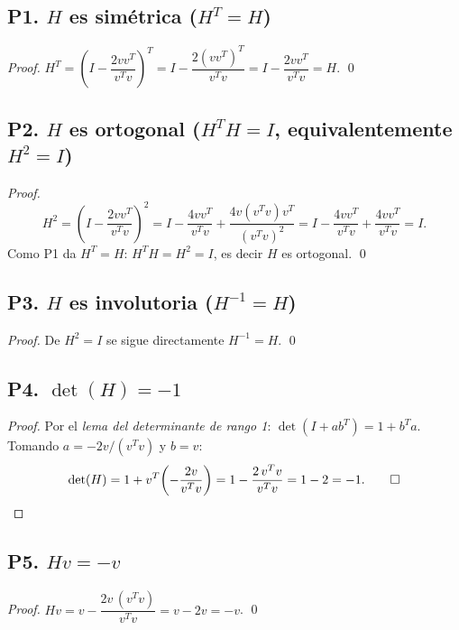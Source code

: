 \documentclass[11pt,a4paper]{article}
\begin{document}
\subsection{P1. $H$ es simétrica ($H^T = H$)}

\begin{proof}
$H^T = \left(I - \dfrac{2vv^T}{v^Tv}\right)^T = I - \dfrac{2(vv^T)^T}{v^Tv}
= I - \dfrac{2vv^T}{v^Tv} = H$. \qed
\end{proof}

\subsection{P2. $H$ es ortogonal ($H^TH = I$, equivalentemente $H^2 = I$)}

\begin{proof}
\[
  H^2 = \left(I - \frac{2vv^T}{v^Tv}\right)^2
  = I - \frac{4vv^T}{v^Tv} + \frac{4v(v^Tv)v^T}{(v^Tv)^2}
  = I - \frac{4vv^T}{v^Tv} + \frac{4vv^T}{v^Tv} = I.
\]
Como P1 da $H^T = H$: $H^TH = H^2 = I$, es decir $H$ es ortogonal. \qed
\end{proof}

\subsection{P3. $H$ es involutoria ($H^{-1} = H$)}

\begin{proof}
De $H^2 = I$ se sigue directamente $H^{-1} = H$. \qed
\end{proof}

\subsection{P4. $\det(H) = -1$}

\begin{proof}
Por el \textit{lema del determinante de rango 1}: $\det(I + ab^T) = 1 + b^Ta$.
Tomando $a = -2v/(v^Tv)$ y $b = v$:
\[
  \det(H) = 1 + v^T\!\left(-\frac{2v}{v^Tv}\right) = 1 - \frac{2\,v^Tv}{v^Tv} = 1-2 = -1. \qed
\]
\end{proof}

\subsection{P5. $Hv = -v$}

\begin{proof}
$Hv = v - \dfrac{2v\,(v^Tv)}{v^Tv} = v - 2v = -v$. \qed
\end{proof}
\end{document}
